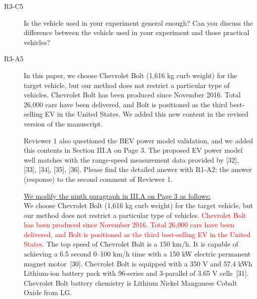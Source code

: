 \documentclass[onecolumn]{IEEEconf}
\begin{document}
\begin{description}
\item [R3-C5] Is the vehicle used in your experiment general enough? Can you discuss the difference between the vehicle used in your experiment and those practical vehicles?

\item [R3-A5] In this paper, we choose Chevrolet Bolt (1,616 kg curb weight) for the target vehicle, but our method does not restrict a particular type of vehicles. Chevrolet Bolt has been produced since November 2016. Total 26,000 cars have been  delivered, and Bolt is positioned as the third best-selling EV in the United States. We added this new content in the revised version of the manuscript. 

Reviewer 1 also questioned the BEV power model validation, and we added this contents in Section III.A on Page 3. The proposed EV power model well matches with the range-speed measurement data provided by [32], [33], [34], [35], [36]. Please find the detailed answer with R1-A2: the answer (response) to the second comment of Reviewer 1. 

\uline{We modify the ninth paragraph in III.A on Page 3 as follows:}\\
We choose Chevrolet Bolt (1,616 kg curb weight) for the target vehicle, but our method does not restrict a particular type of vehicles. \textcolor{red}{Chevrolet Bolt has been produced since November 2016. Total 26,000 cars have been  delivered, and Bolt is positioned as the third best-selling EV in the United States.} The top speed of Chevrolet Bolt is a 150 km/h. It is capable of achieving a 6.5 second 0--100 km/h time with a 150 kW electric permanent magnet motor~[30]. Chevrolet Bolt is equipped with a 350 V and 57.4 kWh Lithium-ion battery pack with 96-series and 3-parallel of 3.65 V cells~[31]. Chevrolet Bolt battery chemistry is Lithium Nickel Manganese Cobalt Oxide from LG. 

\end{description}
\end{document}
